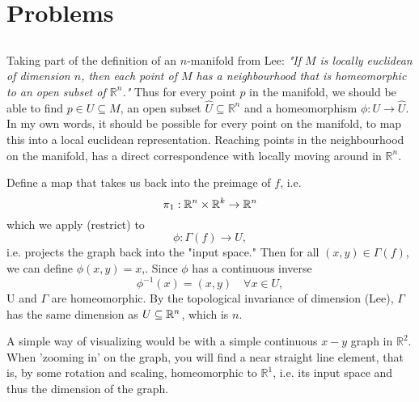 \section{Problems}
\subsection{}
Taking part of the definition of an $n$-manifold from Lee: 
\textit{"If $M$ is locally euclidean of dimension $n$, then each point of $M$ has a neighbourhood that is homeomorphic to an open subset of $\mathbb{R}^n$." } Thus for every point $p$ in the manifold, we should be able to find $p\in U \subseteq M$,  an open subset $\hat{U} \subseteq \mathbb{R}^n$ and a homeomorphism $\phi:U\rightarrow \hat{U}$. In my own words, it should be possible for every point on the manifold, to map this into a local euclidean representation. Reaching points in the neighbourhood on the manifold, has a direct correspondence with locally moving around in $\mathbb{R}^n$.



Define a map that takes us back into the preimage of $f$, i.e.
\[
\pi_1:\mathbb{R}^n\times \mathbb{R}^k \rightarrow \mathbb{R}^n
\]
which we apply (restrict) to 
\[
\phi:\Gamma(f)\rightarrow U,
\]
i.e. projects the graph back into the "input space." 
Then for all $(x,y)\in \Gamma(f)$, we can define $\phi(x,y)=x$,. Since $\phi$ has a continuous inverse 
\[\phi^{-1}(x)=(x,y) \quad \forall x\in U, \]
U and $\Gamma$ are homeomorphic. By the topological invariance of dimension (Lee), $\Gamma$ has the same dimension as $U\subseteq \mathbb{R}^n$, which is $n$.

A simple way of visualizing would be with a simple continuous $x-y$ graph in $\mathbb{R}^2$. When 'zooming in' on the graph, you will find a near straight line element, that is, by some rotation and scaling, homeomorphic to $\mathbb{R}^1$, i.e. its input space and thus the dimension of the graph. 

